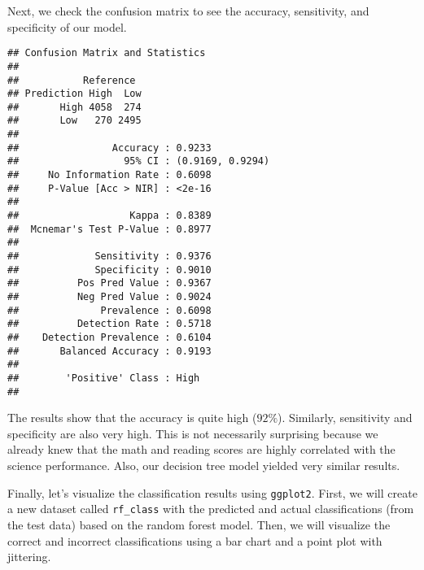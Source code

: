 \documentclass[]{book}
\newenvironment{Shaded}{\begin{snugshade}}{\end{snugshade}}
\newcommand{\DataTypeTok}[1]{\textcolor[rgb]{0.13,0.29,0.53}{#1}}
\newcommand{\KeywordTok}[1]{\textcolor[rgb]{0.13,0.29,0.53}{\textbf{#1}}}
\newcommand{\NormalTok}[1]{#1}
\newcommand{\OperatorTok}[1]{\textcolor[rgb]{0.81,0.36,0.00}{\textbf{#1}}}
\newcommand{\StringTok}[1]{\textcolor[rgb]{0.31,0.60,0.02}{#1}}
\begin{document}
Next, we check the confusion matrix to see the accuracy, sensitivity, and specificity of our model.

\begin{Shaded}
\end{Shaded}

\begin{verbatim}
## Confusion Matrix and Statistics
## 
##           Reference
## Prediction High  Low
##       High 4058  274
##       Low   270 2495
##                                           
##                Accuracy : 0.9233          
##                  95% CI : (0.9169, 0.9294)
##     No Information Rate : 0.6098          
##     P-Value [Acc > NIR] : <2e-16          
##                                           
##                   Kappa : 0.8389          
##  Mcnemar's Test P-Value : 0.8977          
##                                           
##             Sensitivity : 0.9376          
##             Specificity : 0.9010          
##          Pos Pred Value : 0.9367          
##          Neg Pred Value : 0.9024          
##              Prevalence : 0.6098          
##          Detection Rate : 0.5718          
##    Detection Prevalence : 0.6104          
##       Balanced Accuracy : 0.9193          
##                                           
##        'Positive' Class : High            
## 
\end{verbatim}

The results show that the accuracy is quite high (\(92\%\)). Similarly, sensitivity and specificity are also very high. This is not necessarily surprising because we already knew that the math and reading scores are highly correlated with the science performance. Also, our decision tree model yielded very similar results.

Finally, let's visualize the classification results using \texttt{ggplot2}. First, we will create a new dataset called \texttt{rf\_class} with the predicted and actual classifications (from the test data) based on the random forest model. Then, we will visualize the correct and incorrect classifications using a bar chart and a point plot with jittering.
\end{document}
